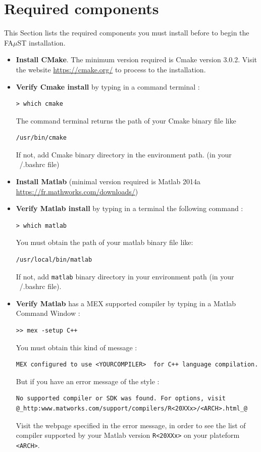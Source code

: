 \section{Required components}\label{sec:RequiredTools}
This Section lists the required components you must install before to begin the FA$\mu$ST installation. 
\begin{itemize}
\item \textbf{Install CMake}. The minimum version required is Cmake version 3.0.2. Visit the website \url{https://cmake.org/} to process to the installation. 


\item \textbf{Verify Cmake install} by typing in a command terminal : 
\lstset{style=customBash}
\begin{lstlisting}
> which cmake
\end{lstlisting}
The command terminal returns the path of your Cmake binary file like

\begin{lstlisting}
/usr/bin/cmake
\end{lstlisting}
If not, add Cmake binary directory in the environment path. (in your ~/.bashrc file)

\item \textbf{Install Matlab} (minimal version required is Matlab 2014a \url{https://fr.mathworks.com/downloads/})

\item \textbf{Verify Matlab install} by typing in a terminal the following command : 
\begin{lstlisting}
> which matlab
\end{lstlisting}
You must obtain the path of your matlab binary file like: 
\begin{lstlisting}
/usr/local/bin/matlab
\end{lstlisting}
If not, add \texttt{matlab} binary directory in your environment path (in your ~/.bashrc file). 
\item \textbf{Verify Matlab} has a MEX supported compiler by typing in a Matlab Command Window :
\lstset{style=customMatlab}
\begin{lstlisting}
>> mex -setup C++
\end{lstlisting}

You must obtain this kind of message :
\begin{lstlisting}
MEX configured to use <YOURCOMPILER>  for C++ language compilation.
\end{lstlisting}

But if you have an error message of the style :
\begin{lstlisting}[moredelim={**[is][\color{blue}]{@}{@}},moredelim={[is][\underbar]{_}{_}}]
No supported compiler or SDK was found. For options, visit 
@_http:www.matworks.com/support/compilers/R<20XXx>/<ARCH>.html_@
\end{lstlisting}
Visit the webpage specified in the error message,
in order to see the list of compiler supported by your Matlab version \texttt{R<20XXx>} on your plateform \texttt{<ARCH>}.

\end{itemize}


